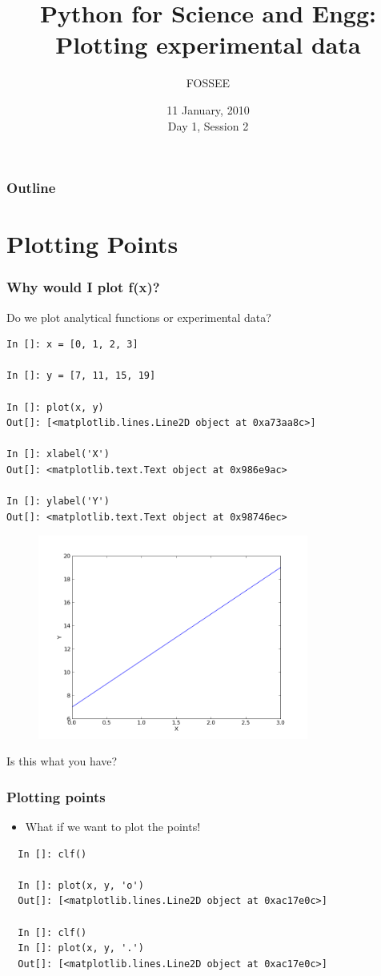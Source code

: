 \documentclass[14pt,compress]{beamer}
\title[Plotting with Python]{Python for Science and Engg: Plotting experimental data}
\author[FOSSEE] {FOSSEE}
\institute[IIT Bombay] {Department of Aerospace Engineering\\IIT Bombay}
\date[] {11 January, 2010\\Day 1, Session 2}
\begin{document}
\begin{frame}
  \titlepage
\end{frame}

\begin{frame}
  \frametitle{Outline}
  \tableofcontents
\end{frame}

\section{Plotting Points}
\begin{frame}[fragile]
\frametitle{Why would I plot f(x)?}
Do we plot analytical functions or experimental data?
\begin{small}
\begin{lstlisting}
In []: x = [0, 1, 2, 3]

In []: y = [7, 11, 15, 19]

In []: plot(x, y)
Out[]: [<matplotlib.lines.Line2D object at 0xa73aa8c>]

In []: xlabel('X')
Out[]: <matplotlib.text.Text object at 0x986e9ac>

In []: ylabel('Y')
Out[]: <matplotlib.text.Text object at 0x98746ec>
\end{lstlisting}
\end{small}
\end{frame}

\begin{frame}[fragile]
\begin{figure}
\includegraphics[width=3.5in]{data/straightline.png}
\end{figure}
\alert{Is this what you have?}
\end{frame}

\begin{frame}[fragile]
\frametitle{Plotting points}
\begin{itemize}
\item What if we want to plot the points!
\end{itemize}
\begin{lstlisting}
  In []: clf()

  In []: plot(x, y, 'o')
  Out[]: [<matplotlib.lines.Line2D object at 0xac17e0c>]

  In []: clf()
  In []: plot(x, y, '.')
  Out[]: [<matplotlib.lines.Line2D object at 0xac17e0c>]
\end{lstlisting}
\end{frame}
\end{document}
